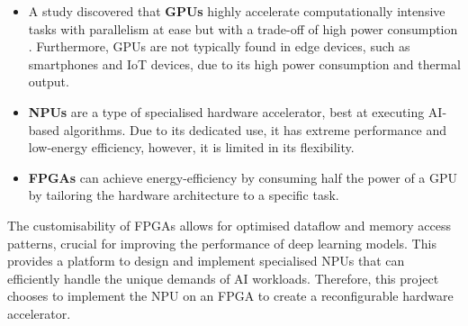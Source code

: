 \documentclass[12pt, a4paper, ukenglish]{article}
\begin{document}
    \begin{itemize}
        \item A study discovered that \textbf{GPUs} highly accelerate computationally intensive tasks with parallelism at ease but with a trade-off of high power consumption \cite{oh_investigation_2017}. Furthermore, GPUs are not typically found in edge devices, such as smartphones and IoT devices, due to its high power consumption and thermal output. 
        \item \textbf{NPUs} are a type of specialised hardware accelerator, best at executing AI-based algorithms. Due to its dedicated use, it has extreme performance and low-energy efficiency, however, it is limited in its flexibility.
        \item \textbf{FPGAs} can achieve energy-efficiency by consuming half the power of a GPU \cite{liu_energy-efficient_2024} by tailoring the hardware architecture to a specific task. 
    \end{itemize}
    
    The customisability of FPGAs allows for optimised dataflow and memory access patterns, crucial for improving the performance of deep learning models. This provides a platform to design and implement specialised NPUs that can efficiently handle the unique demands of AI workloads. Therefore, this project chooses to implement the NPU on an FPGA to create a reconfigurable hardware accelerator. 

    


    
\end{document}
